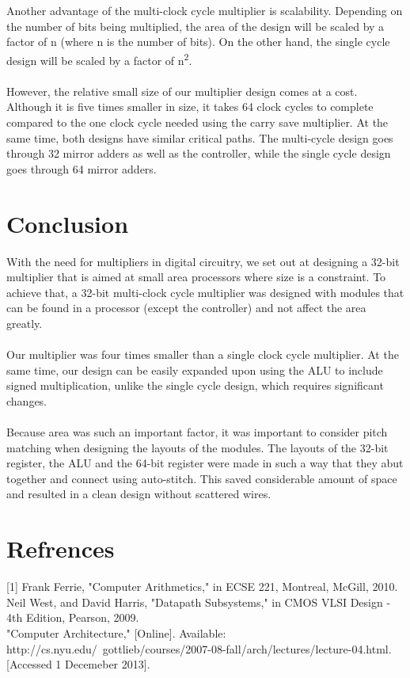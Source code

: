 \documentclass{report}
\begin{document}
  \\\\
  Another advantage of the multi-clock cycle multiplier is scalability. Depending on the number of bits being multiplied, the area of the design will be scaled by a factor of n (where n is the number of bits). On the other hand, the single cycle design will be scaled by a factor of n\textsuperscript{2}.
 \\\\
  However, the relative small size of our multiplier design comes at a cost. Although it is five times smaller in size, it takes 64 clock cycles to complete compared to the one clock cycle needed using the carry save multiplier. At the same time, both designs have similar critical paths. The multi-cycle design goes through 32 mirror adders as well as the controller, while the single cycle design goes through 64 mirror adders.
  \section*{Conclusion}
 With the need for multipliers in digital circuitry, we set out at designing a 32-bit multiplier that is aimed at small area processors where size is a constraint. To achieve that, a 32-bit multi-clock cycle multiplier was designed with modules that can be found in a processor (except the controller) and not affect the area greatly. 
 \\\\
 Our multiplier was four times smaller than a single clock cycle multiplier. At the same time, our design can be easily expanded upon using the ALU to include signed multiplication, unlike the single cycle design, which requires significant changes.
 \\\\
 Because area was such an important factor, it was important to consider pitch matching when designing the layouts of the modules. The layouts of the 32-bit register, the ALU and the 64-bit register were made in such a way that they abut together and connect using auto-stitch. This saved considerable amount of space and resulted in a clean design without scattered wires.
 
  
  \section*{Refrences}
  [1] 	Frank Ferrie, "Computer Arithmetics," in ECSE 221, Montreal, McGill, 2010. 
  \\\noindent
  [2] 	Neil West, and David Harris, "Datapath Subsystems," in CMOS VLSI Design - 4th Edition, Pearson, 2009.
  \\\noindent
  [3] 	"Computer Architecture," [Online]. Available: http://cs.nyu.edu/~gottlieb/courses/2007-08-fall/arch/lectures/lecture-04.html. [Accessed 1 Decemeber 2013].
  
  
 
\end{document}
